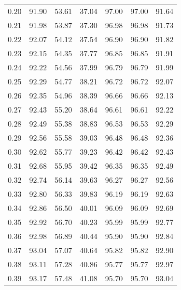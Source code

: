 \begin{tabular}{|c|c|c|c|c|c|c|}
      0.20 &     91.90 &     53.61 &      37.04 &   97.00 &      97.00 &         91.64 \\
      0.21 &     91.98 &     53.87 &      37.30 &   96.98 &      96.98 &         91.73 \\
      0.22 &     92.07 &     54.12 &      37.54 &   96.90 &      96.90 &         91.82 \\
      0.23 &     92.15 &     54.35 &      37.77 &   96.85 &      96.85 &         91.91 \\
      0.24 &     92.22 &     54.56 &      37.99 &   96.79 &      96.79 &         91.99 \\
      0.25 &     92.29 &     54.77 &      38.21 &   96.72 &      96.72 &         92.07 \\
      0.26 &     92.35 &     54.96 &      38.39 &   96.66 &      96.66 &         92.13 \\
      0.27 &     92.43 &     55.20 &      38.64 &   96.61 &      96.61 &         92.22 \\
      0.28 &     92.49 &     55.38 &      38.83 &   96.53 &      96.53 &         92.29 \\
      0.29 &     92.56 &     55.58 &      39.03 &   96.48 &      96.48 &         92.36 \\
      0.30 &     92.62 &     55.77 &      39.23 &   96.42 &      96.42 &         92.43 \\
      0.31 &     92.68 &     55.95 &      39.42 &   96.35 &      96.35 &         92.49 \\
      0.32 &     92.74 &     56.14 &      39.63 &   96.27 &      96.27 &         92.56 \\
      0.33 &     92.80 &     56.33 &      39.83 &   96.19 &      96.19 &         92.63 \\
      0.34 &     92.86 &     56.50 &      40.01 &   96.09 &      96.09 &         92.69 \\
      0.35 &     92.92 &     56.70 &      40.23 &   95.99 &      95.99 &         92.77 \\
      0.36 &     92.98 &     56.89 &      40.44 &   95.90 &      95.90 &         92.84 \\
      0.37 &     93.04 &     57.07 &      40.64 &   95.82 &      95.82 &         92.90 \\
      0.38 &     93.11 &     57.28 &      40.86 &   95.77 &      95.77 &         92.97 \\
      0.39 &     93.17 &     57.48 &      41.08 &   95.70 &      95.70 &         93.04 \\

\end{tabular}
